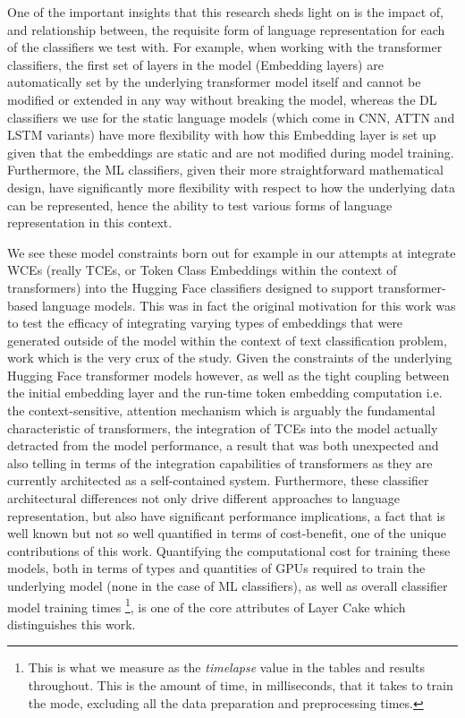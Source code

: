 \documentclass[final]{clv2025}
\begin{document}
One of the important insights that this research sheds light on is the impact of, and relationship between, the requisite form of language representation for each of the classifiers we test with. For example, when working with the transformer classifiers, the first set of layers in the model (Embedding layers) are automatically set by the underlying transformer model itself and cannot be modified or extended in any way without breaking the model, whereas the DL classifiers we use for the static language models (which come in CNN, ATTN and LSTM variants) have more flexibility with how this Embedding layer is set up given that the embeddings are static and are not modified during model training. Furthermore, the ML classifiers, given their more straightforward mathematical design, have significantly more flexibility with respect to how the underlying data can be represented, hence the ability to test various forms of language representation in this context. 

We see these model constraints born out for example in our attempts at integrate WCEs (really TCEs, or Token Class Embeddings within the context of transformers) into the Hugging Face classifiers designed to support transformer-based language models. This was in fact the original motivation for this work was to test the efficacy of integrating varying types of embeddings that were generated outside of the model within the context of text classification problem, work which is the very crux of the \cite{moreo2021} study. Given the constraints of the underlying Hugging Face transformer models however, as well as the tight coupling between the initial embedding layer and the run-time token embedding computation i.e. the context-sensitive, attention mechanism which is arguably the fundamental characteristic of transformers, the integration of TCEs into the model actually detracted from the model performance, a result that was both unexpected and also telling in terms of the integration capabilities of transformers as they are currently architected as a self-contained system. Furthermore, these classifier architectural differences not only drive different approaches to language representation, but also have significant performance implications, a fact that is well known but not so well quantified in terms of cost-benefit, one of the unique contributions of this work. Quantifying the computational cost for training these models, both in terms of types and quantities of GPUs required to train the underlying model (none in the case of ML classifiers), as well as overall classifier model training times \footnote{This is what we measure as the \textit{timelapse} value in the tables and results throughout. This is the amount of time, in milliseconds, that it takes to train the mode, excluding all the data preparation and preprocessing times.}, is one of the core attributes of Layer Cake which distinguishes this work.
\end{document}

